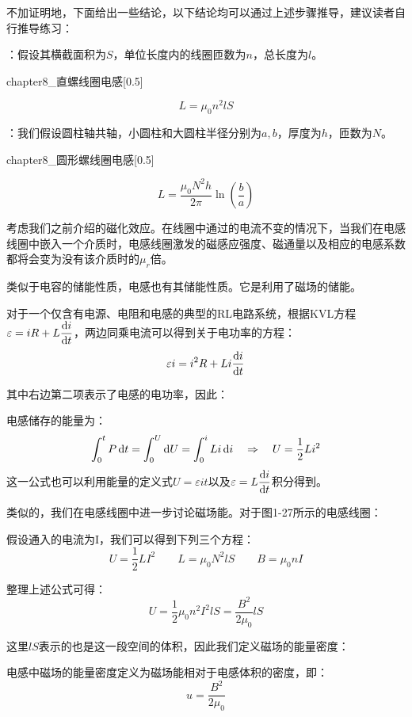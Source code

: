 不加证明地，下面给出一些结论，以下结论均可以通过上述步骤推导，建议读者自行推导练习：
\begin{Itemize}
    \item {}：假设其横截面积为$S$，单位长度内的线圈匝数为$n$，总长度为$l$。
        \begin{singlefigure}[电磁阀]{chapter8_直螺线圈电感}[0.5]
        \end{singlefigure}
        \[L = \mu_0 n^2 lS\]
    \item {}：我们假设圆柱轴共轴，小圆柱和大圆柱半径分别为$a,b$，厚度为$h$，匝数为$N$。
        \begin{singlefigure}[环面]{chapter8_圆形螺线圈电感}[0.5]
        \end{singlefigure}
        \[L = \dfrac{\mu_0 N^2 h}{2\pi}\ln(\dfrac{b}{a})\]
\end{Itemize}

考虑我们之前介绍的磁化效应。在线圈中通过的电流不变的情况下，当我们在电感线圈中嵌入一个介质时，电感线圈激发的磁感应强度、磁通量以及相应的电感系数都将会变为没有该介质时的$\mu_r$倍。

类似于电容的储能性质，电感也有其储能性质。它是利用了磁场的储能。

对于一个仅含有电源、电阻和电感的典型的RL电路系统，根据KVL方程$\varepsilon = iR + L\dfrac{\dif{i}}{\dif{t}}$，两边同乘电流可以得到关于电功率的方程：
\[\varepsilon i = i^2R + Li\dfrac{\dif{i}}{\dif{t}}\]

其中右边第二项表示了电感的电功率，因此：
\begin{law}[电感的储能性质]
    电感储存的能量为：
    \[\int_0^t P\dif{t}=\int_0^U \dif{U} = \int_0^i Li\dif{i}\quad\Rightarrow\quad U = \dfrac{1}{2}Li^2\]
    这一公式也可以利用能量的定义式$U=\varepsilon i t$以及$\varepsilon = L\dfrac{\dif{i}}{\dif{t}}$积分得到。
\end{law}

类似的，我们在电感线圈中进一步讨论磁场能。对于图1-27所示的电感线圈：

假设通入的电流为I，我们可以得到下列三个方程：
\[U = \dfrac{1}{2}LI^2\qquad L = \mu_0 N^2 lS\qquad B=\mu_0 nI\]

整理上述公式可得：
\[U = \dfrac{1}{2}\mu_0 n^2 I^2 lS = \dfrac{B^2}{2\mu_0}lS\]

这里$lS$表示的也是这一段空间的体积，因此我们定义磁场的能量密度：
\begin{law}[磁场的能量密度]
    电感中磁场的能量密度定义为磁场能相对于电感体积的密度，即：
    \[u = \dfrac{B^2}{2\mu_0}\]
\end{law}

